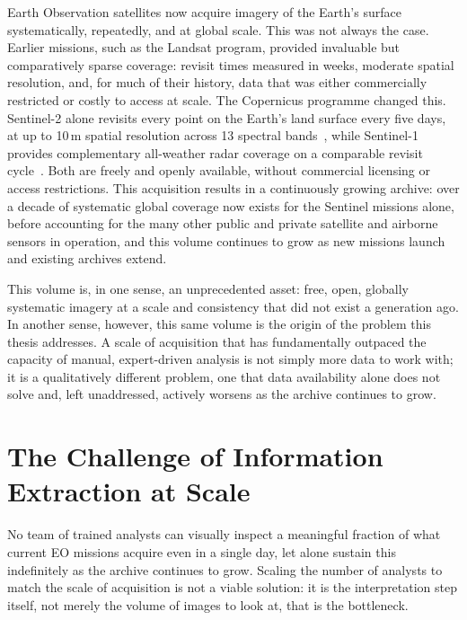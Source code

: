 Earth Observation satellites now acquire imagery of the Earth's surface systematically, repeatedly, and at global scale. This was not always the case. Earlier missions, such as the Landsat program, provided invaluable but comparatively sparse coverage: revisit times measured in weeks, moderate spatial resolution, and, for much of their history, data that was either commercially restricted or costly to access at scale. The Copernicus programme changed this. Sentinel-2 alone revisits every point on the Earth's land surface every five days, at up to 10\,m spatial resolution across 13 spectral bands~\cite{sentinel2}, while Sentinel-1 provides complementary all-weather radar coverage on a comparable revisit cycle~\cite{sentinel1}. Both are freely and openly available, without commercial licensing or access restrictions. This acquisition results in a continuously growing archive: over a decade of systematic global coverage now exists for the Sentinel missions alone, before accounting for the many other public and private satellite and airborne sensors in operation, and this volume continues to grow as new missions launch and existing archives extend.
 
This volume is, in one sense, an unprecedented asset: free, open, globally systematic imagery at a scale and consistency that did not exist a generation ago. In another sense, however, this same volume is the origin of the problem this thesis addresses. A scale of acquisition that has fundamentally outpaced the capacity of manual, expert-driven analysis is not simply more data to work with; it is a qualitatively different problem, one that data availability alone does not solve and, left unaddressed, actively worsens as the archive continues to grow.
 
\section{The Challenge of Information Extraction at Scale}
\label{sec:intro_extraction_challenge}
 
No team of trained analysts can visually inspect a meaningful fraction of what current EO missions acquire even in a single day, let alone sustain this indefinitely as the archive continues to grow. Scaling the number of analysts to match the scale of acquisition is not a viable solution: it is the interpretation step itself, not merely the volume of images to look at, that is the bottleneck.
 
